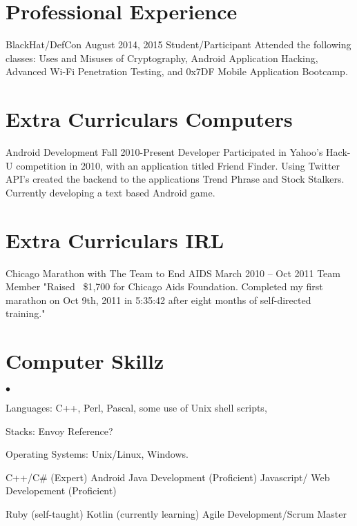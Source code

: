 \documentclass[margin,line]{res}
\newenvironment{list2}{
  \begin{list}{$\bullet$}{
      \setlength{\itemsep}{0in}
      \setlength{\parsep}{0in} \setlength{\parskip}{0in}
      \setlength{\topsep}{0in} \setlength{\partopsep}{0in} 
      \setlength{\leftmargin}{0.2in}}}{\end{list}}
\begin{document}
\begin{resume}
\section{\sc Professional Experience}
BlackHat/DefCon				August 2014, 2015		Student/Participant
Attended the following classes: Uses and Misuses of Cryptography, 
Android Application Hacking, Advanced Wi-Fi Penetration Testing, 
and 0x7DF Mobile Application Bootcamp.

\section{\sc Extra Curriculars Computers}
Android Development				Fall 2010-Present			Developer
Participated in Yahoo’s Hack-U competition in 2010, with an
 application titled Friend Finder. 
Using Twitter API’s created the backend to the applications 
Trend Phrase and Stock Stalkers. 
Currently developing a text based Android game.

\section{\sc Extra Curriculars IRL}

Chicago Marathon with
The Team to End AIDS				March 2010 – Oct 2011		Team Member
"Raised ~\$1,700 for Chicago Aids Foundation. Completed my first
marathon on Oct 9th, 2011 in 5:35:42 after eight months of self-directed training."


\section{\sc Computer Skillz} 
\begin{list2}
\item Languages:  C++, Perl, Pascal, some use of Unix shell scripts,
\item Stacks: Envoy Reference?
\item  
\item Operating Systems:  Unix/Linux, Windows.\\
\end{list2}
C++/C\# (Expert)
Android Java Development (Proficient)
Javascript/ Web Developement (Proficient) 

Ruby (self-taught)
Kotlin (currently learning)
Agile Development/Scrum Master

\end{resume}
\end{document}

